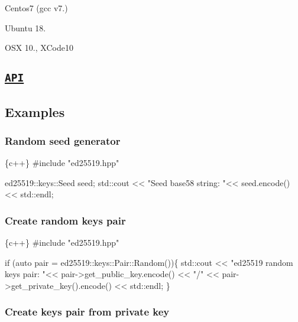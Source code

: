 \begin{DoxyEnumerate}
\item Centos7 (gcc v7.)
\end{DoxyEnumerate}
\begin{DoxyEnumerate}
\item Ubuntu 18.
\end{DoxyEnumerate}
\begin{DoxyEnumerate}
\item O\+SX 10., X\+Code10
\end{DoxyEnumerate}

\subsection*{\href{https://htmlpreview.github.io/?https://github.com/dnevera/ed25519cpp/blob/master/docs/html/namespaces.html}{\tt A\+PI}}

\subsection*{Examples}

\subsubsection*{Random seed generator}


\begin{DoxyCode}
\{c++\}
#include "ed25519.hpp"


ed25519::keys::Seed seed;
std::cout << "Seed base58 string: "<< seed.encode() << std::endl;
\end{DoxyCode}


\subsubsection*{Create random keys pair}


\begin{DoxyCode}
\{c++\}
#include "ed25519.hpp"

if (auto pair = ed25519::keys::Pair::Random())\{
    std::cout << "ed25519 random keys pair: "<< pair->get\_public\_key.encode() << "/" << 
       pair->get\_private\_key().encode() << std::endl;
\}
\end{DoxyCode}


\subsubsection*{Create keys pair from private key}


